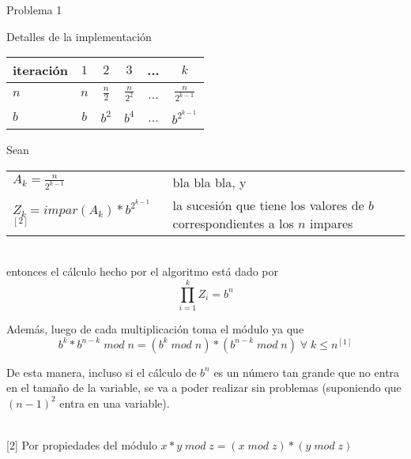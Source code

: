 \begin{section}{Problema 1}
\begin{subsection}{Detalles de la implementación}
		\vspace{0.5cm}
		\begin{center}
		\begin{tabular}{|l|c|c|c|c|c|}
			\hline
			iteración   & $1$ & $2$           & $3$             & ... & $k$ \\
			\hline
			$n$         & $n$ & $\frac{n}{2}$ & $\frac{n}{2^2}$ & ... & $\frac{n}{2^{k-1}}$ \\
			\hline
			$b$         & $b$ & $b^2$         & $b^4$           & ... & $b^{2^{k-1}}$ \\
			\hline
		\end{tabular}
		\end{center}

		\vspace{0.5cm}
		\noindent Sean \\
		\indent
		\begin{tabular}{ll}
			$A_k = \frac{n}{2^{k-1}}$ & bla bla bla, y \\
			$Z_k = impar(A_k) * b^{2^{k-1}}$ $^{[2]}$ & la sucesión que tiene los valores de $b$ correspondientes a los $n$ impares
		\end{tabular} \\
		\vspace{0.2cm}
		entonces el cálculo hecho por el algoritmo está dado por 
		$$\displaystyle\prod_{i=1}^k Z_i = b^n$$

\noindent Además, luego de cada multiplicación toma el módulo ya que
 $$b^k * b^{n-k}\; mod\;n = (b^k\;mod\;n)*(b^{n-k}\;mod\;n)\;\forall\;k\leq n ^{[1]}$$

De esta manera, incluso si el cálculo de $b^n$ es un número tan grande que no entra en el tamaño de la variable, se va a poder realizar sin problemas (suponiendo que $(n-1)^2$ entra en una variable).

\vspace{0.5cm}
 \\
{\footnotesize [2] Por propiedades del módulo $x*y\; mod \; z = (x\; mod\; z)*(y\; mod\; z)$ } \\


	\end{subsection}


\end{section}

